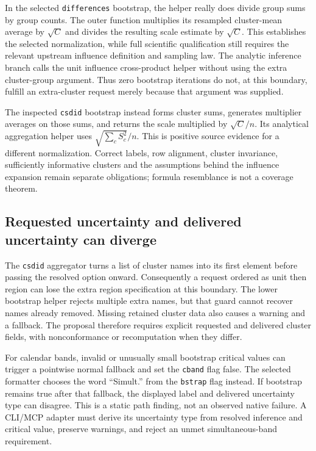 In the selected \texttt{differences} bootstrap, the helper really does divide
group sums by group counts. The outer function multiplies its resampled
cluster-mean average by $\sqrt C$ and divides the resulting scale estimate
by $\sqrt C$. This establishes the selected normalization, while full
scientific qualification still requires the relevant upstream influence
definition and sampling law. The analytic inference branch calls the
unit influence cross-product helper without using the extra cluster-group
argument. Thus zero bootstrap iterations do not, at this boundary, fulfill
an extra-cluster request merely because that argument was supplied.
\citep{exec24_panelpy_differences}

The inspected \texttt{csdid} bootstrap instead forms cluster sums, generates
multiplier averages on those sums, and returns the scale multiplied by
$\sqrt C/n$. Its analytical aggregation helper uses
$\sqrt{\sum_c S_c^2}/n$. This is positive source evidence for a different
normalization. Correct labels, row alignment, cluster invariance, sufficiently
informative clusters and the assumptions behind the influence expansion
remain separate obligations; formula resemblance is not a coverage theorem.
\citep{exec24_panelpy_csdid}

\subsection{Requested uncertainty and delivered uncertainty can diverge}
The \texttt{csdid} aggregator turns a list of cluster names into its first
element before passing the resolved option onward. Consequently a request
ordered as unit then region can lose the extra region specification at this
boundary. The lower bootstrap helper rejects multiple extra names, but that
guard cannot recover names already removed. Missing retained cluster data
also causes a warning and a fallback. The proposal therefore requires
explicit requested and delivered cluster fields, with nonconformance or
recomputation when they differ.
\citep{exec24_panelpy_csdid,exec24_panelpy_contract}

For calendar bands, invalid or unusually small bootstrap critical values
can trigger a pointwise normal fallback and set the \texttt{cband} flag
false. The selected formatter chooses the word ``Simult.'' from the
\texttt{bstrap} flag instead. If bootstrap remains true after that fallback,
the displayed label and delivered uncertainty type can disagree. This is a
static path finding, not an observed native failure. A CLI/MCP adapter must
derive its uncertainty type from resolved inference and critical value,
preserve warnings, and reject an unmet simultaneous-band requirement.
\citep{exec24_panelpy_csdid,exec24_panelpy_contract}

